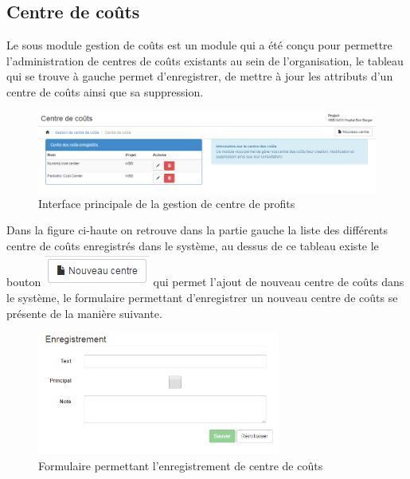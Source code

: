 \documentclass[12pt,a4paper]{report}
\begin{document}
\subsection{Centre de coûts}
Le sous module gestion de coûts est un module qui a été conçu pour permettre l'administration de centres de coûts existants au sein de l'organisation, le tableau qui se trouve à gauche permet d’enregistrer, de mettre à jour les attributs d'un centre de coûts ainsi que sa suppression.
\begin{figure}[h]
\begin{center}
\includegraphics[width=14cm]{pic/CostCenter.png}
\end{center}
\caption{Interface principale de la gestion de centre de profits}
\label{Interface principale de la gestion de centre de profits}
\end{figure}

\newpage
Dans la figure ci-haute on retrouve dans la partie gauche la liste des différents centre de coûts enregistrés dans le système, au dessus de ce tableau existe le bouton \includegraphics[scale=1]{pic/NewCostCenter.png} qui permet l'ajout de nouveau centre de coûts dans le système, le formulaire permettant d'enregistrer un nouveau centre de coûts se présente de la manière suivante.

\begin{figure}[h]
\begin{center}
\includegraphics[width=8cm]{pic/FormAddCostCenter.png}
\end{center}
\caption{Formulaire permettant l'enregistrement de centre de coûts}
\label{Formulaire permettant l'enregistrement de centre de coûts}
\end{figure} 
\end{document}
